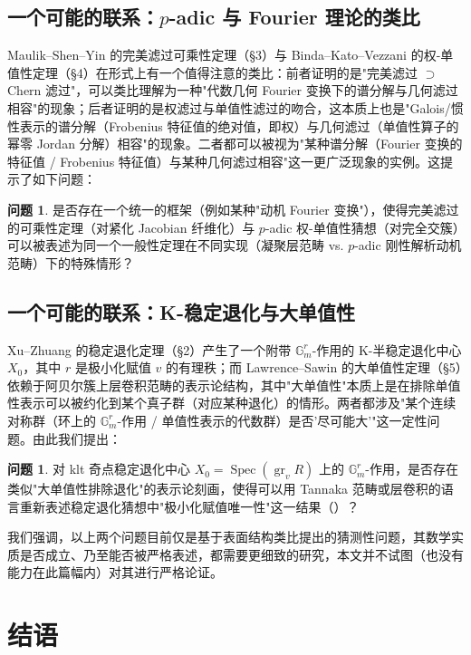\documentclass[11pt,a4paper]{article}
\theoremstyle{definition}
\newtheorem{question}[theorem]{问题}
\theoremstyle{remark}
\DeclareMathOperator{\Spec}{Spec}
\DeclareMathOperator{\gr}{gr}
\begin{document}
\subsection{一个可能的联系：$p$-adic 与 Fourier 理论的类比}

Maulik--Shen--Yin 的完美滤过可乘性定理（\S 3）与 Binda--Kato--Vezzani 的权-单值性定理（\S 4）在形式上有一个值得注意的类比：前者证明的是"完美滤过 $\supset$ Chern 滤过"，可以类比理解为一种"代数几何 Fourier 变换下的谱分解与几何滤过相容"的现象；后者证明的是权滤过与单值性滤过的吻合，这本质上也是"Galois/惯性表示的谱分解（Frobenius 特征值的绝对值，即权）与几何滤过（单值性算子的幂零 Jordan 分解）相容"的现象。二者都可以被视为"某种谱分解（Fourier 变换的特征值 / Frobenius 特征值）与某种几何滤过相容"这一更广泛现象的实例。这提示了如下问题：

\begin{question}
是否存在一个统一的框架（例如某种"动机 Fourier 变换"），使得完美滤过的可乘性定理（对紧化 Jacobian 纤维化）与 $p$-adic 权-单值性猜想（对完全交簇）可以被表述为同一个一般性定理在不同实现（凝聚层范畴 vs. $p$-adic 刚性解析动机范畴）下的特殊情形？
\end{question}

\subsection{一个可能的联系：K-稳定退化与大单值性}

Xu--Zhuang 的稳定退化定理（\S 2）产生了一个附带 $\mathbb{G}_m^r$-作用的 K-半稳定退化中心 $X_0$，其中 $r$ 是极小化赋值 $v$ 的有理秩；而 Lawrence--Sawin 的大单值性定理（\S 5）依赖于阿贝尔簇上层卷积范畴的表示论结构，其中"大单值性"本质上是在排除单值性表示可以被约化到某个真子群（对应某种退化）的情形。两者都涉及"某个连续对称群（环上的 $\mathbb{G}_m^r$-作用 / 单值性表示的代数群）是否'尽可能大'"这一定性问题。由此我们提出：

\begin{question}
对 klt 奇点稳定退化中心 $X_0 = \Spec(\gr_v R)$ 上的 $\mathbb{G}_m^r$-作用，是否存在类似"大单值性排除退化"的表示论刻画，使得可以用 Tannaka 范畴或层卷积的语言重新表述稳定退化猜想中"极小化赋值唯一性"这一结果（\cite{XZ2021}）？
\end{question}

我们强调，以上两个问题目前仅是基于表面结构类比提出的猜测性问题，其数学实质是否成立、乃至能否被严格表述，都需要更细致的研究，本文并不试图（也没有能力在此篇幅内）对其进行严格论证。

\section{结语}
\end{document}
